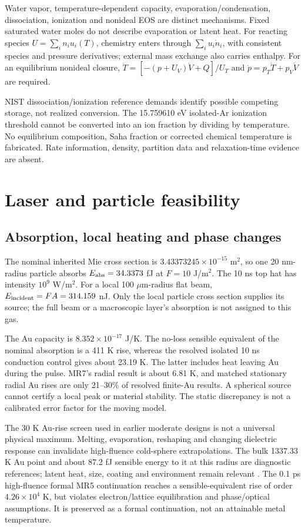 \documentclass[10pt,a4paper]{article}
\begin{document}
Water vapor, temperature-dependent capacity, evaporation/condensation, dissociation, ionization and nonideal EOS are distinct mechanisms. Fixed saturated water moles do not describe evaporation or latent heat. For reacting species $U=\sum_i n_i u_i(T)$, chemistry enters through $\sum_i u_i\dot n_i$, with consistent species and pressure derivatives; external mass exchange also carries enthalpy. For an equilibrium nonideal closure, $\dot T=[-(p+U_V)\dot V+Q]/U_T$ and $\dot p=p_T\dot T+p_V\dot V$ are required.

NIST dissociation/ionization reference demands identify possible competing storage, not realized conversion.
The 15.759610 eV isolated-Ar ionization threshold \cite{nistgas} cannot be converted into an ion fraction by dividing by temperature. No equilibrium composition, Saha fraction or corrected chemical temperature is fabricated. Rate information, density, partition data and relaxation-time evidence are absent.
\clearpage
\section{Laser and particle feasibility}
\subsection{Absorption, local heating and phase changes}
The nominal inherited Mie cross section is $3.43373245\times10^{-15}$ m$^2$, so one 20 nm-radius particle absorbs $E_{\rm abs}=34.3373$ fJ at $F=10$ J/m$^2$. The 10 ns top hat has intensity $10^9$ W/m$^2$. For a local 100 $\mu$m-radius flat beam, $E_{\rm incident}=FA=314.159$ nJ. Only the local particle cross section supplies its source; the full beam or a macroscopic layer's absorption is not assigned to this gas.

The Au capacity is $8.352\times10^{-17}$ J/K. The no-loss sensible equivalent of the nominal absorption is a 411 K rise, whereas the resolved isolated 10 ns conduction control gives about 23.19 K. The latter includes heat leaving Au during the pulse. MR7's radial result is about 6.81 K, and matched stationary radial Au rises are only 21--30\% of resolved finite-Au results. A spherical source cannot certify a local peak or material stability. The static discrepancy is not a calibrated error factor for the moving model.

The 30 K Au-rise screen used in earlier moderate designs is not a universal physical maximum. Melting, evaporation, reshaping and changing dielectric response can invalidate high-fluence cold-sphere extrapolations. The bulk 1337.33 K Au point and about 87.2 fJ sensible energy to it at this radius are diagnostic references; latent heat, size, coating and environment remain relevant \cite{nistau}. The 0.1 ps high-fluence formal MR5 continuation reaches a sensible-equivalent rise of order $4.26\times10^4$ K, but violates electron/lattice equilibration and phase/optical assumptions. It is preserved as a formal continuation, not an attainable metal temperature.
\end{document}
